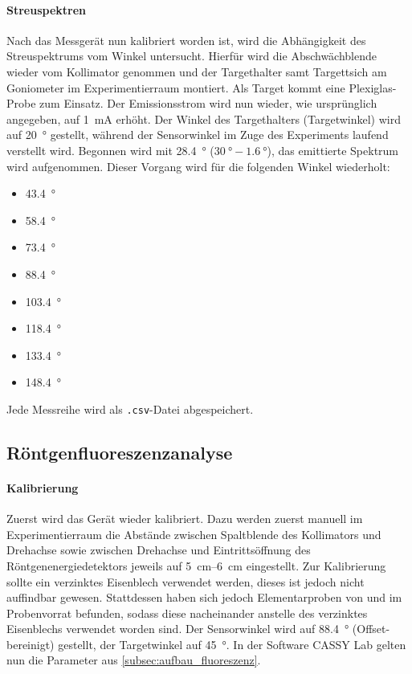 \documentclass[ngerman]{scrartcl}
\begin{document}
\paragraph{Streuspektren}
Nach das Messgerät nun kalibriert worden ist, wird die Abhängigkeit des Streuspektrums vom Winkel untersucht. Hierfür wird die Abschwächblende wieder vom Kollimator genommen und der Targethalter samt Targettsich am Goniometer im Experimentierraum montiert. Als Target kommt eine Plexiglas-Probe zum Einsatz. Der Emissionsstrom wird nun wieder, wie ursprünglich angegeben, auf \SI{1}{mA} erhöht. Der Winkel des Targethalters (Targetwinkel) wird auf \SI{20}{\degree} gestellt, während der Sensorwinkel im Zuge des Experiments laufend verstellt wird. Begonnen wird mit \SI{28.4}{\degree} ($\SI{30}{\degree} - \SI{1.6}{\degree}$), das emittierte Spektrum wird aufgenommen. Dieser Vorgang wird für die folgenden Winkel wiederholt:
\begin{itemize}
    \item \SI{43.4}{\degree}
    \item \SI{58.4}{\degree}
    \item \SI{73.4}{\degree}
    \item \SI{88.4}{\degree}
    \item \SI{103.4}{\degree}
    \item \SI{118.4}{\degree}
    \item \SI{133.4}{\degree}
    \item \SI{148.4}{\degree}
\end{itemize}
Jede Messreihe wird als \texttt{.csv}-Datei abgespeichert.


\subsection{Röntgenfluoreszenzanalyse}
\label{subsec:durchfuehrung_fluoreszenz}

\paragraph{Kalibrierung}
Zuerst wird das Gerät wieder kalibriert. Dazu werden zuerst manuell im Experimentierraum die Abstände zwischen Spaltblende des Kollimators und Drehachse sowie zwischen Drehachse und Eintrittsöffnung des Röntgenenergiedetektors jeweils auf \SIrange{5}{6}{cm} eingestellt. Zur Kalibrierung sollte ein verzinktes Eisenblech verwendet werden, dieses ist jedoch nicht auffindbar gewesen. Stattdessen haben sich jedoch Elementarproben von  und  im Probenvorrat befunden, sodass diese nacheinander anstelle des verzinktes Eisenblechs verwendet worden sind. Der Sensorwinkel wird auf \SI{88.4}{\degree} (Offset-bereinigt) gestellt, der Targetwinkel auf \SI{45}{\degree}. In der Software CASSY Lab gelten nun die Parameter aus \autoref{subsec:aufbau_fluoreszenz}.
\end{document}
